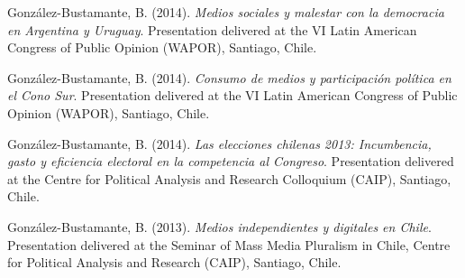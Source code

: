 \begin{publications}
\begin{benumerate}{87}

\item{González-Bustamante, B. (2014). {\itshape Medios sociales y malestar con la democracia en Argentina y Uruguay}. Presentation delivered at the VI Latin American Congress of Public Opinion (WAPOR), Santiago, Chile.}\vspace{1mm}


\item{González-Bustamante, B. (2014). {\itshape Consumo de medios y participación política en el Cono Sur}. Presentation delivered at the VI Latin American Congress of Public Opinion (WAPOR), Santiago, Chile.}\vspace{1mm}


\item{González-Bustamante, B. (2014). {\itshape Las elecciones chilenas 2013: Incumbencia, gasto y eficiencia electoral en la competencia al Congreso}. Presentation delivered at the Centre for Political Analysis and Research Colloquium (CAIP), Santiago, Chile.}\vspace{1mm}


\item{González-Bustamante, B. (2013). {\itshape Medios independientes y digitales en Chile}. Presentation delivered at the Seminar of Mass Media Pluralism in Chile, Centre for Political Analysis and Research (CAIP), Santiago, Chile.}\vspace{1mm}


\end{benumerate}
\end{publications}
